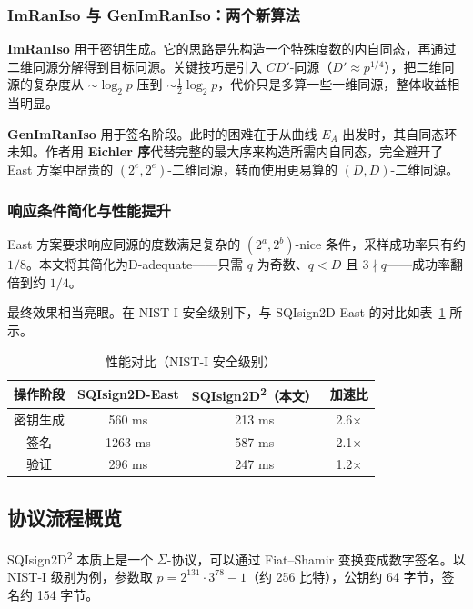 \documentclass[12pt,a4paper]{ctexart}
\begin{document}
\subsubsection{ImRanIso 与 GenImRanIso：两个新算法}

\textbf{ImRanIso} 用于密钥生成。它的思路是先构造一个特殊度数的内自同态，再通过二维同源分解得到目标同源。关键技巧是引入 $CD'$-同源（$D' \approx p^{1/4}$），把二维同源的复杂度从 $\sim \log_2 p$ 压到 $\sim \frac{1}{2}\log_2 p$，代价只是多算一些一维同源，整体收益相当明显。

\textbf{GenImRanIso} 用于签名阶段。此时的困难在于从曲线 $E_A$ 出发时，其自同态环未知。作者用 \textbf{Eichler 序}代替完整的最大序来构造所需内自同态，完全避开了 East 方案中昂贵的 $(2^e, 2^e)$-二维同源，转而使用更易算的 $(D, D)$-二维同源。

\subsubsection{响应条件简化与性能提升}

East 方案要求响应同源的度数满足复杂的 $(2^a, 2^b)$-nice 条件，采样成功率只有约 $1/8$。本文将其简化为D-adequate——只需 $q$ 为奇数、$q < D$ 且 $3 \nmid q$——成功率翻倍到约 $1/4$。

最终效果相当亮眼。在 NIST-I 安全级别下，与 SQIsign2D-East 的对比如表~\ref{tab:perf} 所示。

\begin{table}[htbp]
\centering
\caption{性能对比（NIST-I 安全级别）}
\label{tab:perf}
\begin{tabular}{@{}cccc@{}}
\toprule
操作阶段 & SQIsign2D-East & SQIsign2D\textsuperscript{2}（本文） & 加速比 \\
\midrule
密钥生成 & 560 ms & 213 ms & 2.6$\times$ \\
签名 & 1263 ms & 587 ms & 2.1$\times$ \\
验证 & 296 ms & 247 ms & 1.2$\times$ \\
\bottomrule
\end{tabular}
\end{table}

\subsection{协议流程概览}

SQIsign2D\textsuperscript{2} 本质上是一个 $\Sigma$-协议，可以通过 Fiat--Shamir 变换变成数字签名。以 NIST-I 级别为例，参数取 $p = 2^{131} \cdot 3^{78} - 1$（约 256 比特），公钥约 64 字节，签名约 154 字节。
\end{document}
